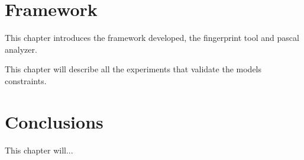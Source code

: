 \documentclass[
papersize=a4,
pagelayout=default,
fontname=latinmodern,
fontsize=11pt,
twoside,
final,
faculty=fpms,
]{umons-Thesis}
\begin{document}
	
	\chapter{Framework}
	This chapter introduces the framework developed, the fingerprint tool and pascal analyzer.
	
	
	

	This chapter will describe all the experiments that validate the models constraints.
	
	
	\chapter{Conclusions}
	This chapter will...
	
	
	
	
	\backmatter
	
	
\end{document}
